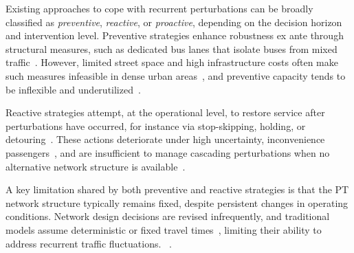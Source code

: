 \documentclass[a4paper,fleqn]{cas-sc}
\begin{document}
Existing approaches to cope with recurrent perturbations can be broadly classified as \emph{preventive}, \emph{reactive}, or \emph{proactive}, depending on the decision horizon and intervention level. 
Preventive strategies enhance robustness ex ante through structural measures, such as dedicated bus lanes that isolate buses from mixed traffic~\citep{russo2022dedicated}. 
However, limited street space and high infrastructure costs often make such measures infeasible in dense urban areas~\citep{li2009evaluation}, and preventive capacity tends to be inflexible and underutilized~\citep{ITF2024, ITF2025}.

Reactive strategies attempt, at the operational level, to restore service after perturbations have occurred, for instance via stop-skipping, holding, or detouring~\citep{peled2021quality, tang2018optimal, zheng2023multi}. 
These actions deteriorate under high uncertainty, inconvenience passengers~\citep[\S{}2]{GkiotsalitisCats2021}, and are insufficient to manage cascading perturbations when no alternative network structure is available~\citep{mahdavi2024resilience}.

A key limitation shared by both preventive and reactive strategies is that the PT network structure typically remains fixed, despite persistent changes in operating conditions. 
Network design decisions are revised infrequently, and traditional models assume deterministic or fixed travel times~\citep{Fonseca2020, BuechelCorman2020}, limiting their ability to address recurrent traffic fluctuations.
%
~\citep{Peled2019}.
\end{document}
